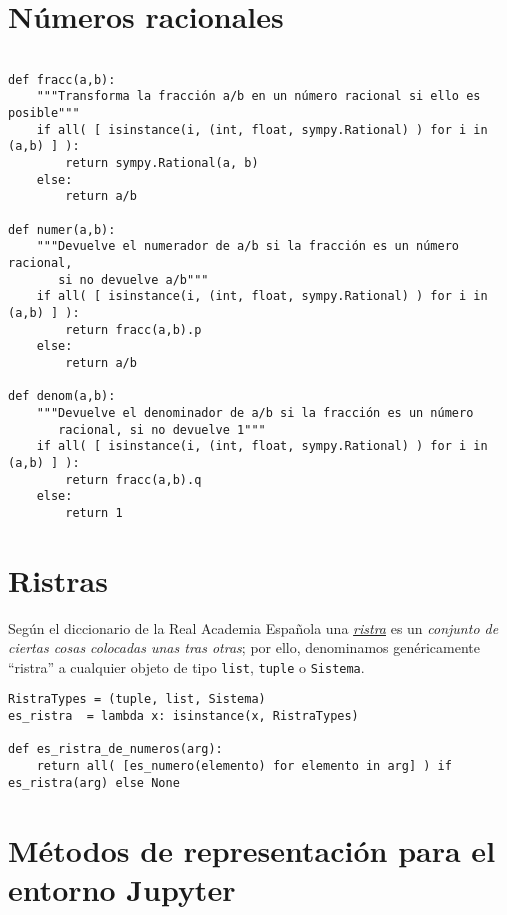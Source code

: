 \documentclass[11pt]{report}
\begin{document}
\section{Números racionales}
\label{sec:org197eada}

\begin{verbatim}

def fracc(a,b):
    """Transforma la fracción a/b en un número racional si ello es posible"""
    if all( [ isinstance(i, (int, float, sympy.Rational) ) for i in (a,b) ] ):
        return sympy.Rational(a, b)
    else:
        return a/b
    
def numer(a,b):
    """Devuelve el numerador de a/b si la fracción es un número racional,
       si no devuelve a/b"""
    if all( [ isinstance(i, (int, float, sympy.Rational) ) for i in (a,b) ] ):
        return fracc(a,b).p
    else:
        return a/b 

def denom(a,b):
    """Devuelve el denominador de a/b si la fracción es un número
       racional, si no devuelve 1"""
    if all( [ isinstance(i, (int, float, sympy.Rational) ) for i in (a,b) ] ):
        return fracc(a,b).q
    else:
        return 1

\end{verbatim}

\section{Ristras}
\label{sec:org4573279}

Según el diccionario de la Real Academia Española una \href{https://dle.rae.es/ristra}{\emph{ristra}} es un
\emph{conjunto de ciertas cosas colocadas unas tras otras}; por ello,
denominamos genéricamente ``ristra'' a cualquier objeto de tipo
\texttt{list}, \texttt{tuple} o \texttt{Sistema}.

\begin{verbatim}
RistraTypes = (tuple, list, Sistema)
es_ristra  = lambda x: isinstance(x, RistraTypes) 

def es_ristra_de_numeros(arg):
    return all( [es_numero(elemento) for elemento in arg] ) if es_ristra(arg) else None

\end{verbatim}
\section{Métodos de representación para el entorno Jupyter}
\label{sec:orgf634e5f}
\end{document}

